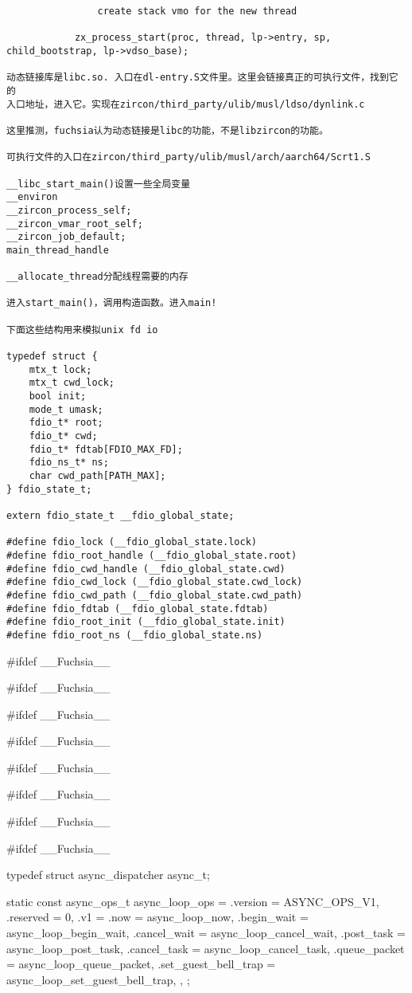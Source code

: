 \begin{verbatim}
                create stack vmo for the new thread

            zx_process_start(proc, thread, lp->entry, sp, child_bootstrap, lp->vdso_base);

动态链接库是libc.so. 入口在dl-entry.S文件里。这里会链接真正的可执行文件，找到它的
入口地址，进入它。实现在zircon/third_party/ulib/musl/ldso/dynlink.c

这里推测，fuchsia认为动态链接是libc的功能，不是libzircon的功能。

可执行文件的入口在zircon/third_party/ulib/musl/arch/aarch64/Scrt1.S

__libc_start_main()设置一些全局变量
__environ
__zircon_process_self;
__zircon_vmar_root_self;
__zircon_job_default;
main_thread_handle

__allocate_thread分配线程需要的内存

进入start_main()，调用构造函数。进入main!

下面这些结构用来模拟unix fd io

typedef struct {
    mtx_t lock;
    mtx_t cwd_lock;
    bool init;
    mode_t umask;
    fdio_t* root;
    fdio_t* cwd;
    fdio_t* fdtab[FDIO_MAX_FD];
    fdio_ns_t* ns;
    char cwd_path[PATH_MAX];
} fdio_state_t;

extern fdio_state_t __fdio_global_state;

#define fdio_lock (__fdio_global_state.lock)
#define fdio_root_handle (__fdio_global_state.root)
#define fdio_cwd_handle (__fdio_global_state.cwd)
#define fdio_cwd_lock (__fdio_global_state.cwd_lock)
#define fdio_cwd_path (__fdio_global_state.cwd_path)
#define fdio_fdtab (__fdio_global_state.fdtab)
#define fdio_root_init (__fdio_global_state.init)
#define fdio_root_ns (__fdio_global_state.ns)

\end{verbatim}

#ifdef __Fuchsia__

#ifdef __Fuchsia__

#ifdef __Fuchsia__

#ifdef __Fuchsia__

#ifdef __Fuchsia__

#ifdef __Fuchsia__

#ifdef __Fuchsia__

#ifdef __Fuchsia__

typedef struct async_dispatcher async_t;

static const async_ops_t async_loop_ops = {
    .version = ASYNC_OPS_V1,
    .reserved = 0,
    .v1 = {
        .now = async_loop_now,
        .begin_wait = async_loop_begin_wait,
        .cancel_wait = async_loop_cancel_wait,
        .post_task = async_loop_post_task,
        .cancel_task = async_loop_cancel_task,
        .queue_packet = async_loop_queue_packet,
        .set_guest_bell_trap = async_loop_set_guest_bell_trap,
    },
};

